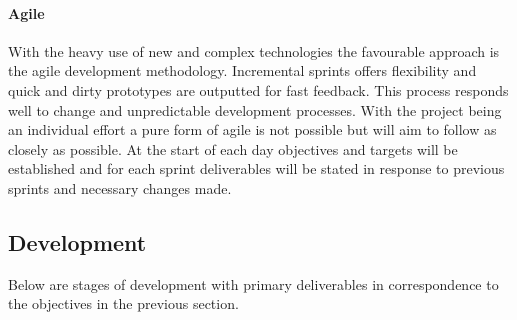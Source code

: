 \documentclass[a4paper, 11pt]{article}
\begin{document}
 \vspace{\baselineskip}
  \vspace{\baselineskip}

\paragraph{Agile}With the heavy use of new and complex technologies the favourable approach is the agile development methodology. Incremental sprints offers flexibility and quick and dirty prototypes are outputted for fast feedback. This process responds well to change and unpredictable development processes. With the project being an individual effort a pure form of agile is not possible but will aim to follow as closely as possible. At the start of each day objectives and targets will be established and for each sprint deliverables will be stated in response to previous sprints and necessary changes made.

\subsection{Development}
Below are stages of development with primary deliverables in correspondence to the objectives in the previous section.
\end{document}
